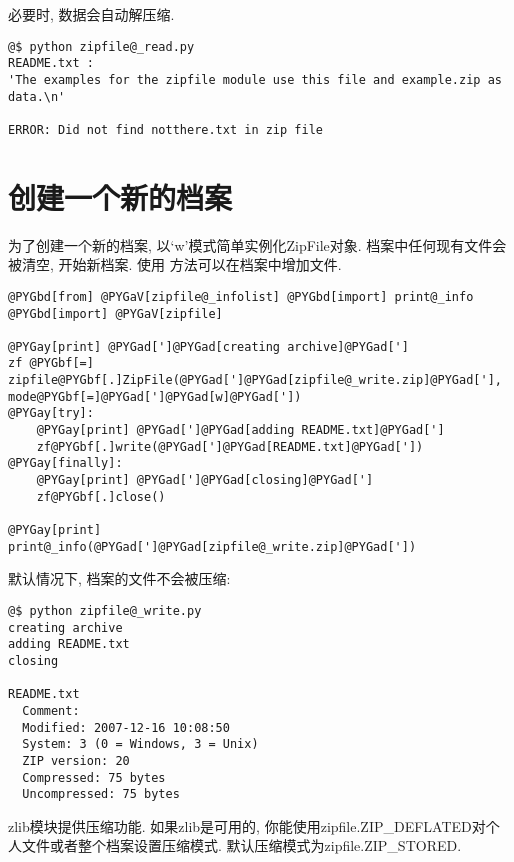 \documentclass[a4paper,10pt,english]{manual}
\begin{document}
必要时, 数据会自动解压缩.

\begin{Verbatim}[commandchars=@\[\]]
@$ python zipfile@_read.py
README.txt :
'The examples for the zipfile module use this file and example.zip as data.\n'

ERROR: Did not find notthere.txt in zip file
\end{Verbatim}


\section{创建一个新的档案}

为了创建一个新的档案, 以‘w’模式简单实例化ZipFile对象. 档案中任何现有文件会被清空, 开始新档案. 使用  方法可以在档案中增加文件.

\begin{Verbatim}[commandchars=@\[\]]
@PYGbd[from] @PYGaV[zipfile@_infolist] @PYGbd[import] print@_info
@PYGbd[import] @PYGaV[zipfile]

@PYGay[print] @PYGad[']@PYGad[creating archive]@PYGad[']
zf @PYGbf[=] zipfile@PYGbf[.]ZipFile(@PYGad[']@PYGad[zipfile@_write.zip]@PYGad['], mode@PYGbf[=]@PYGad[']@PYGad[w]@PYGad['])
@PYGay[try]:
    @PYGay[print] @PYGad[']@PYGad[adding README.txt]@PYGad[']
    zf@PYGbf[.]write(@PYGad[']@PYGad[README.txt]@PYGad['])
@PYGay[finally]:
    @PYGay[print] @PYGad[']@PYGad[closing]@PYGad[']
    zf@PYGbf[.]close()

@PYGay[print]
print@_info(@PYGad[']@PYGad[zipfile@_write.zip]@PYGad['])
\end{Verbatim}

默认情况下, 档案的文件不会被压缩:

\begin{Verbatim}[commandchars=@\[\]]
@$ python zipfile@_write.py
creating archive
adding README.txt
closing

README.txt
  Comment:
  Modified: 2007-12-16 10:08:50
  System: 3 (0 = Windows, 3 = Unix)
  ZIP version: 20
  Compressed: 75 bytes
  Uncompressed: 75 bytes
\end{Verbatim}

zlib模块提供压缩功能. 如果zlib是可用的, 你能使用zipfile.ZIP\_DEFLATED对个人文件或者整个档案设置压缩模式. 默认压缩模式为zipfile.ZIP\_STORED.
\end{document}
